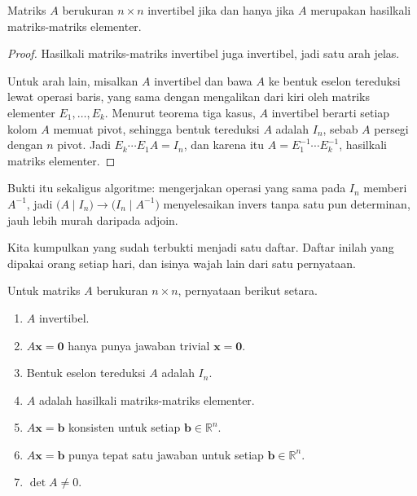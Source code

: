 \begin{teorema}
Matriks $A$ berukuran $n\times n$ invertibel jika dan hanya jika $A$ merupakan hasilkali
matriks-matriks elementer.
\end{teorema}

\begin{proof}
Hasilkali matriks-matriks invertibel juga invertibel, jadi satu arah jelas.

Untuk arah lain, misalkan $A$ invertibel dan bawa $A$ ke bentuk eselon tereduksi lewat
operasi baris, yang sama dengan mengalikan dari kiri oleh matriks elementer
$E_{1},\dots,E_{k}$. Menurut teorema tiga kasus, $A$ invertibel berarti setiap kolom $A$
memuat pivot, sehingga bentuk tereduksi $A$ adalah $I_{n}$, sebab $A$ persegi dengan $n$
pivot. Jadi $E_{k}\cdots E_{1}A=I_{n}$, dan karena itu
$A=E_{1}^{-1}\cdots E_{k}^{-1}$, hasilkali matriks elementer.
\end{proof}

Bukti itu sekaligus algoritme: mengerjakan operasi yang sama pada $I_{n}$ memberi $A^{-1}$,
jadi $\bigl(A\mid I_{n}\bigr)\to\bigl(I_{n}\mid A^{-1}\bigr)$ menyelesaikan invers tanpa
satu pun determinan, jauh lebih murah daripada adjoin.

Kita kumpulkan yang sudah terbukti menjadi satu daftar. Daftar inilah yang dipakai orang
setiap hari, dan isinya wajah lain dari satu pernyataan.

\begin{teorema}
Untuk matriks $A$ berukuran $n\times n$, pernyataan berikut setara.
\begin{enumerate}
  \item $A$ invertibel.
  \item $A\mathbf{x}=\mathbf{0}$ hanya punya jawaban trivial $\mathbf{x}=\mathbf{0}$.
  \item Bentuk eselon tereduksi $A$ adalah $I_{n}$.
  \item $A$ adalah hasilkali matriks-matriks elementer.
  \item $A\mathbf{x}=\mathbf{b}$ konsisten untuk setiap $\mathbf{b}\in\mathbb{R}^{n}$.
  \item $A\mathbf{x}=\mathbf{b}$ punya tepat satu jawaban untuk setiap
        $\mathbf{b}\in\mathbb{R}^{n}$.
  \item $\det A\neq0$.
\end{enumerate}
\end{teorema}

